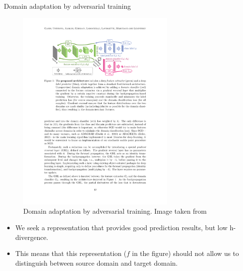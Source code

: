 \documentclass[xcolor=pdftex,dvipsnames,table]{beamer}
\begin{document}
\begin{frame}{Domain adaptation by adversarial training}
\begin{figure}[htb]
   \centering
   \includegraphics[width=0.7\textwidth]{../graphics/domain_adaptation.pdf}
   \caption{Domain adaptation by adversarial training. Image taken from \cite{Ganin2016}}
\end{figure}
\begin{itemize}
   \item We seek a representation that provides good prediction results, but low h-divergence. 
   \item This means that this representation ($f$ in the figure) should not allow us to distinguish between source domain and target domain. 
\end{itemize}
\end{frame}
\end{document}
